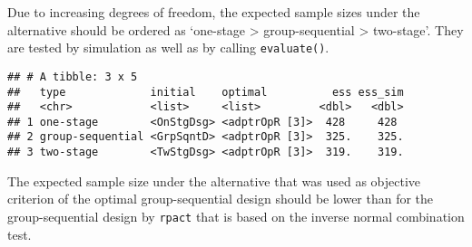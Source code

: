 \documentclass[
]{book}
\newenvironment{Shaded}{\begin{snugshade}}{\end{snugshade}}
\newcommand{\AttributeTok}[1]{\textcolor[rgb]{0.77,0.63,0.00}{#1}}
\newcommand{\CommentTok}[1]{\textcolor[rgb]{0.56,0.35,0.01}{\textit{#1}}}
\newcommand{\DecValTok}[1]{\textcolor[rgb]{0.00,0.00,0.81}{#1}}
\newcommand{\FunctionTok}[1]{\textcolor[rgb]{0.00,0.00,0.00}{#1}}
\newcommand{\NormalTok}[1]{#1}
\newcommand{\SpecialCharTok}[1]{\textcolor[rgb]{0.00,0.00,0.00}{#1}}
\begin{document}
Due to increasing degrees of freedom, the expected sample sizes under the
alternative should be ordered as `one-stage \textgreater{} group-sequential \textgreater{} two-stage'.
They are tested by simulation as well as by calling \texttt{evaluate()}.

\begin{Shaded}
\end{Shaded}

\begin{verbatim}
## # A tibble: 3 x 5
##   type             initial    optimal          ess ess_sim
##   <chr>            <list>     <list>         <dbl>   <dbl>
## 1 one-stage        <OnStgDsg> <adptrOpR [3]>  428     428 
## 2 group-sequential <GrpSqntD> <adptrOpR [3]>  325.    325.
## 3 two-stage        <TwStgDsg> <adptrOpR [3]>  319.    319.
\end{verbatim}

The expected sample size under the alternative that was used as objective criterion
of the optimal group-sequential design should be lower than for the
group-sequential design by \texttt{rpact} that is based on the inverse normal
combination test.
\end{document}
